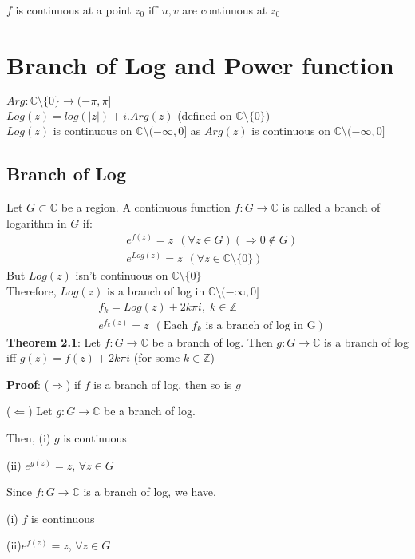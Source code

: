 \documentclass{article}
\begin{document}
\begin{flushleft}
$f$ is continuous at a point $z_0$ iff $u,v$ are continuous at $z_0$

\clearpage

\section{Branch of Log and Power function}
$Arg: \mathds{C}\setminus \{0\} \rightarrow (-\pi,\pi]$\\
$Log(z)=log(|z|)+i.Arg(z)$ (defined on $\mathds{C}\setminus \{0\}$)\\
$Log(z)$ is continuous on $\mathds{C}\setminus (-\infty,0]$ as $Arg(z)$ is continuous on $\mathds{C}\setminus (-\infty,0]$\\
\subsection{\textbf{Branch of Log}}
Let $G\subset \mathds{C}$ be a region. A continuous function $f:G\rightarrow \mathds{C}$ is called a branch of logarithm in $G$ if:
\begin{align}
&e^{f(z)}=z \:\:(\forall z\in G) (\Rightarrow 0\notin G)\nonumber\\
&e^{Log(z)}=z \:\: (\forall z\in \mathds{C}\setminus \{0\})\nonumber
\end{align}
But $Log(z)$ isn't continuous on $\mathds{C}\setminus\{0\}$\\
Therefore, $Log(z)$ is a branch of log in $\mathds{C}\setminus (-\infty,0]$ 
\begin{align}
&f_k=Log(z)+2k\pi i\text{,}\:\: k\in \mathds{Z}\nonumber \\
&e^{f_k(z)}=z \:\:(\text{Each $f_k$ is a branch of log in G})\nonumber
\end{align}
\textbf{Theorem 2.1}: Let $f:G\rightarrow \mathds{C}$ be a branch of log. Then $g:G\rightarrow \mathds{C}$ is a branch of log iff $g(z)=f(z)+2k\pi i$ (for some $k\in \mathds{Z}$)

\textbf{Proof}: ($\Rightarrow$) if $f$ is a branch of log, then so is $g$

($\Leftarrow$) Let $g:G\rightarrow \mathds{C}$ be a branch of log. 

Then, (i) $g$ is continuous

(ii) $e^{g(z)}=z$, $\forall z\in G$

Since $f:G\rightarrow \mathds{C}$ is a branch of log, we have, 

(i) $f$ is continuous 

(ii)$e^{f(z)}=z$, $\forall z\in G$


\end{flushleft}
\end{document}
